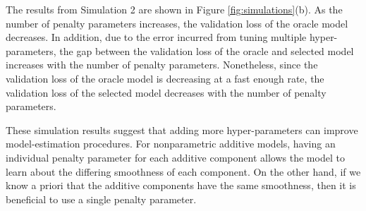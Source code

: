 \documentclass[12pt]{article} %
\theoremstyle{definition}
\begin{document}
The results from Simulation 2 are shown in Figure \ref{fig:simulations}(b). As the number of penalty parameters increases, the validation loss of the oracle model decreases. In addition, due to the error incurred from tuning multiple hyper-parameters, the gap between the validation loss of the oracle and selected model increases with the number of penalty parameters. Nonetheless, since the validation loss of the oracle model is decreasing at a fast enough rate, the validation loss of the selected model decreases with the number of penalty parameters.

These simulation results suggest that adding more hyper-parameters can improve model-estimation procedures. For nonparametric additive models, having an individual penalty parameter for each additive component allows the model to learn about the differing smoothness of each component. On the other hand, if we know a priori that the additive components have the same smoothness, then it is beneficial to use a single penalty parameter.
\end{document}

